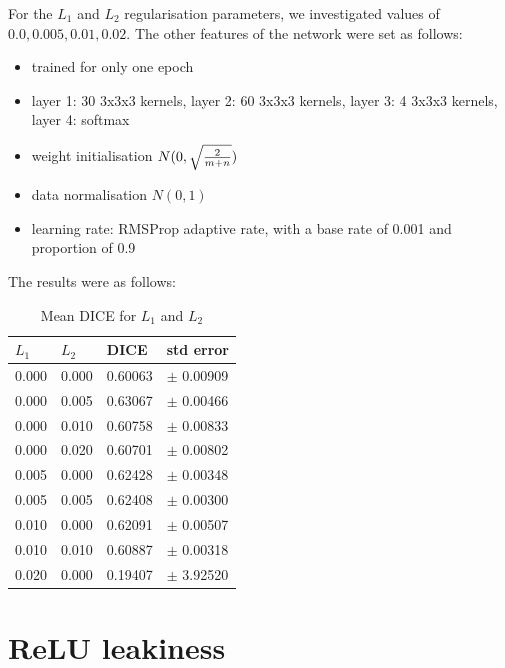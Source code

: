 \documentclass[msc]{infthesis}
\begin{document}
For the \(L_1\) and \(L_2\) regularisation parameters, we investigated values of \(0.0, 0.005, 0.01, 0.02\).
The other features of the network were set as follows:
\begin{itemize}
\item trained for only one epoch
\item layer 1: 30 3x3x3 kernels, layer 2: 60 3x3x3 kernels, layer 3: 4 3x3x3 kernels, layer 4: softmax
\item weight initialisation \(N(0, \sqrt{2 \over m + n})\)
\item data normalisation \(N(0, 1)\)
\item learning rate: RMSProp adaptive rate, with a base rate of 0.001 and proportion of 0.9
\end{itemize}
The results were as follows:
\begin{table}[ht]
  \centering
  \begin{tabular}[c]{llll}
    \(L_1\) & \(L_2\) & DICE & std error \\
    \hline
    0.000  &  0.000  & 0.60063 & \(\pm\) 0.00909  \\
    0.000  &  0.005  & 0.63067 & \(\pm\) 0.00466  \\
    0.000  &  0.010  & 0.60758 & \(\pm\) 0.00833  \\
    0.000  &  0.020  & 0.60701 & \(\pm\) 0.00802  \\
    0.005  &  0.000  & 0.62428 & \(\pm\) 0.00348  \\
    0.005  &  0.005  & 0.62408 & \(\pm\) 0.00300  \\  
    0.010  &  0.000  & 0.62091 & \(\pm\) 0.00507  \\
    0.010  &  0.010  & 0.60887 & \(\pm\) 0.00318  \\
    0.020  &  0.000  & 0.19407 & \(\pm\) 3.92520  \\
  \end{tabular}
  \caption{Mean DICE for \(L_1\) and \(L_2\)}
\end{table}


\section{ReLU leakiness}
\end{document}
